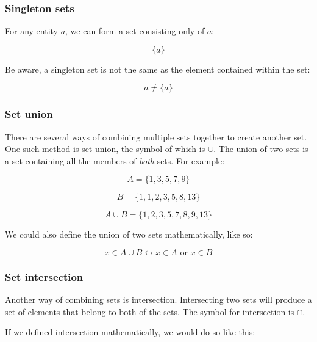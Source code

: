 \subsubsection{Singleton sets}

For any entity $a$, we can form a set consisting only of $a$:

\begin{dmath}
	\{a\}
\end{dmath}

Be aware, a singleton set is not the same as the element contained within the
set:

\begin{dmath}
	a \neq \{a\}
\end{dmath}

\subsubsection{Set union}

There are several ways of combining multiple sets together to create another
set. One such method is set union, the symbol of which is $\cup$. The union of
two sets is a set containing all the members of {\it both} sets. For example:

\begin{dmath}
	A = \{1, 3, 5, 7, 9\}
\end{dmath}

\begin{dmath}
 	B = \{1, 1, 2, 3, 5, 8, 13\}
\end{dmath}

\begin{dmath}
	A \cup B = \{1, 2, 3, 5, 7, 8, 9, 13\}
\end{dmath}

We could also define the union of two sets mathematically, like so:

\begin{dmath}
	{x \in A \cup B \leftrightarrow x \in A \textrm{ or } x \in B}
\end{dmath}

\subsubsection{Set intersection}

Another way of combining sets is intersection. Intersecting two sets will
produce a set of elements that belong to both of the sets. The symbol for
intersection is $\cap$.

If we defined intersection mathematically, we would do so like this:

